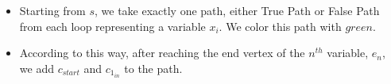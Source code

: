 \begin{itemize}
    \item Starting from $s$, we take exactly one path, either True Path or False Path from each loop representing a variable $x_i$. We color this path with $green$.
    \item According to this way, after reaching the end vertex of the $n^{th}$ variable, $e_n$, we add $c_{start}$ and $c_{1_{in}}$ to the path.
\end{itemize}